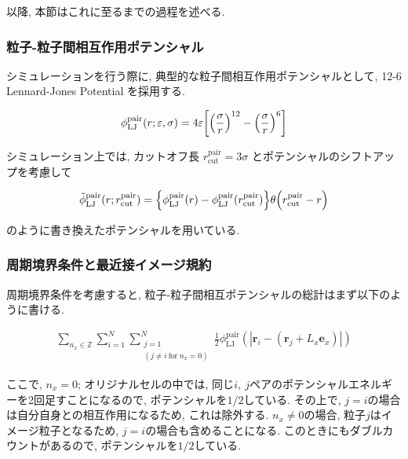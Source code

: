 以降, 本節はこれに至るまでの過程を述べる.

\subsubsection{粒子-粒子間相互作用ポテンシャル}

シミュレーションを行う際に, 典型的な粒子間相互作用ポテンシャルとして, 12-6 Lennard-Jones Potential を採用する.

\begin{align}
  \phi_{\text{LJ}}^{\text{pair}}(r; \varepsilon, \sigma) = 4\varepsilon \qty[\qty(\frac{\sigma}{r})^{12} - \qty(\frac{\sigma}{r})^{6} ] \\
\end{align}

シミュレーション上では, カットオフ長 $r_{\text{cut}}^{\text{pair}}=3\sigma$ とポテンシャルのシフトアップを考慮して

\begin{align}
  \tilde{\phi}_{\text{LJ}}^{\text{pair}}(r;r_{\text{cut}}^{\text{pair}}) = \qty{\phi_{\text{LJ}}^{\text{pair}}(r) - \phi_{\text{LJ}}^{\text{pair}}(r_{\text{cut}}^{\text{pair}})}\theta \qty(r_{\text{cut}}^{\text{pair}}-r) \\
\end{align}

のように書き換えたポテンシャルを用いている.

\subsubsection{周期境界条件と最近接イメージ規約\cite{MD}}

周期境界条件を考慮すると, 粒子-粒子間相互ポテンシャルの総計はまず以下のように書ける.

\begin{align}
  \sum_{n_x \in \mathbb{Z}} \sum_{i=1}^{N} \sum_{\substack{j=1 \\ (j \neq i \ \text{for} \ n_{x} = 0)}}^{N} \frac{1}{2} \phi_{\text{LJ}}^{\text{pair}}(|\bm{r}_i -(\bm{r}_j + L_x \bm{e}_x)|)
\end{align}

ここで, $n_x = 0$; オリジナルセルの中では, 同じ$i,\ j$ペアのポテンシャルエネルギーを2回足すことになるので, ポテンシャルを$1/2$している. その上で, $j = i$の場合は自分自身との相互作用になるため, これは除外する. $n_x \neq 0$の場合, 粒子$j$はイメージ粒子となるため, $j=i$の場合も含めることになる. このときにもダブルカウントがあるので, ポテンシャルを$1/2$している. 

